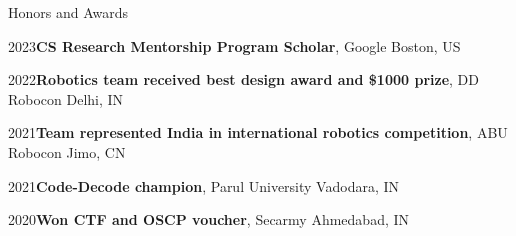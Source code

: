 \documentclass{resume}
\begin{document}







\begin{rSection}{Honors and Awards} 

{2023\hspace{1em}}{\bf CS Research Mentorship Program Scholar}{, Google} \hfill Boston, US \vspace{-0.5em}

{2022\hspace{1em}}{\bf Robotics team received best design award and \$1000 prize}{, DD Robocon} \hfill Delhi, IN \vspace{-0.5em}

{2021\hspace{1em}}{\bf Team represented India in international robotics competition}{, ABU Robocon} \hfill Jimo, CN \vspace{-0.5em}

{2021\hspace{1em}}{\bf Code-Decode champion}{, Parul University} \hfill Vadodara, IN \vspace{-0.5em}

{2020\hspace{1em}}{\bf Won CTF and OSCP voucher}{, Secarmy} \hfill Ahmedabad, IN \vspace{-0.5em}


\end{rSection}
\end{document}
